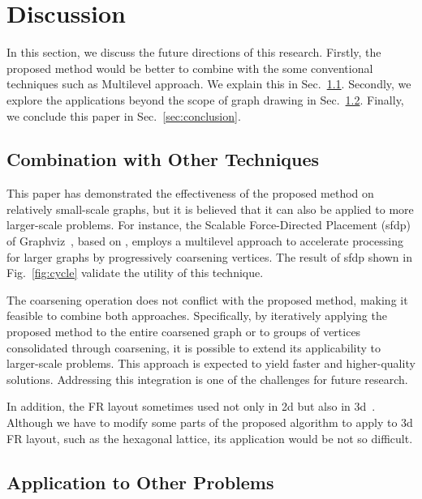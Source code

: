 \documentclass[dvipdfmx,journal]{IEEEtran}
\begin{document}
\section{Discussion} \label{sec:discussion}

In this section, we discuss the future directions of this research.
Firstly, the proposed method would be better to combine with the some conventional techniques such as Multilevel approach. We explain this in Sec.~\ref{sec:combination}.
Secondly, we explore the applications beyond the scope of graph drawing in Sec.~\ref{ssec:application}.
Finally, we conclude this paper in Sec.~\ref{sec:conclusion}.

\subsection{Combination with Other Techniques}\label{sec:combination}

This paper has demonstrated the effectiveness of the proposed method on relatively small-scale graphs, but it is believed that it can also be applied to more larger-scale problems.
For instance, the Scalable Force-Directed Placement (sfdp) of Graphviz~\cite{ellsonGraphvizOpenSource2002}, based on \cite{Hu2006EfficientHF}, employs a multilevel approach to accelerate processing for larger graphs by progressively coarsening vertices.
The result of sfdp shown in Fig.~\ref{fig:cycle} validate the utility of this technique.

The coarsening operation does not conflict with the proposed method, making it feasible to combine both approaches.
Specifically, by iteratively applying the proposed method to the entire coarsened graph or to groups of vertices consolidated through coarsening, it is possible to extend its applicability to larger-scale problems.
This approach is expected to yield faster and higher-quality solutions.
Addressing this integration is one of the challenges for future research.

In addition, the FR layout sometimes used not only in 2d but also in 3d~\cite{14738716211060306}. Although we have to modify some parts of the proposed algorithm to apply to 3d FR layout, such as the hexagonal lattice, its application would be not so difficult.

\subsection{Application to Other Problems}\label{ssec:application}
\end{document}
